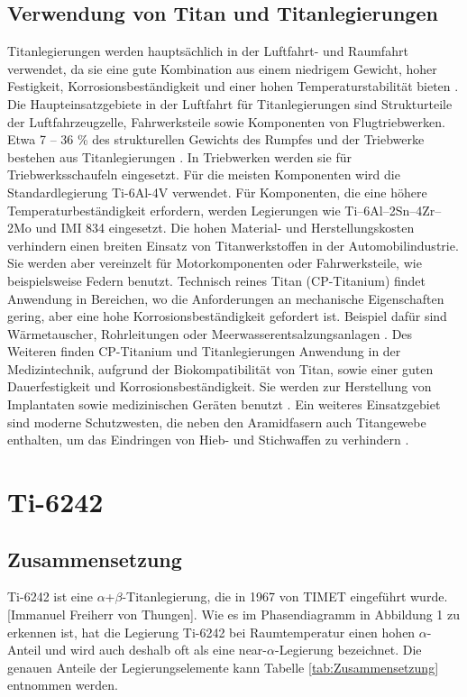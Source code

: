 \pagebreak

\subsection{Verwendung von Titan und Titanlegierungen}
Titanlegierungen werden hauptsächlich in der Luftfahrt- und Raumfahrt verwendet, da sie eine gute Kombination aus einem niedrigem Gewicht, hoher Festigkeit, Korrosionsbeständigkeit und einer hohen Temperaturstabilität bieten \cite{C.Leyens.2005,R.R.Boyer.1996,M.PetersJ.KumpfertC.WardC.Leyens.2003}. Die Haupteinsatzgebiete in der Luftfahrt für Titanlegierungen sind Strukturteile der Luftfahrzeugzelle, Fahrwerksteile sowie Komponenten von Flugtriebwerken. Etwa 7 -- 36 \% des strukturellen Gewichts des Rumpfes und der Triebwerke bestehen aus Titanlegierungen \cite{Lutjering.2007}. In Triebwerken werden sie für Triebwerksschaufeln eingesetzt. Für die meisten Komponenten wird die Standardlegierung Ti-6Al-4V verwendet. Für Komponenten, die eine höhere Temperaturbeständigkeit erfordern, werden Legierungen wie Ti–6Al–2Sn–4Zr–2Mo und IMI 834 eingesetzt. Die hohen Material- und Herstellungskosten verhindern einen breiten Einsatz von Titanwerkstoffen in der Automobilindustrie. Sie werden aber vereinzelt für Motorkomponenten oder Fahrwerksteile, wie beispielsweise Federn benutzt. Technisch reines Titan (CP-Titanium) findet Anwendung in Bereichen, wo die Anforderungen an mechanische Eigenschaften gering, aber eine hohe Korrosionsbeständigkeit gefordert ist. Beispiel dafür sind Wärmetauscher, Rohrleitungen oder Meerwasserentsalzungsanlagen \cite{A.D.KhawajiaI.K.KutubkhanahaJ.M.Wieb.2008}. Des Weiteren finden CP-Titanium und Titanlegierungen Anwendung in der Medizintechnik, aufgrund der Biokompatibilität von Titan, sowie einer guten Dauerfestigkeit und Korrosionsbeständigkeit. Sie werden zur Herstellung von Implantaten sowie medizinischen Geräten benutzt \cite{M.GeethaA.K.SinghR.AsokamaniA.K.Gogia.2009}. Ein weiteres Einsatzgebiet sind moderne Schutzwesten, die neben den Aramidfasern auch Titangewebe enthalten, um das Eindringen von Hieb- und Stichwaffen zu verhindern \cite{C.Leyens.2005}.  



\section{Ti-6242}

\subsection{Zusammensetzung}
Ti-6242 ist eine $\alpha$+$\beta$-Titanlegierung, die  in 1967 von TIMET eingeführt wurde. [Immanuel Freiherr von Thungen]. 
Wie es im Phasendiagramm in Abbildung 1 zu erkennen ist, hat die Legierung Ti-6242 bei Raumtemperatur einen hohen $\alpha$-Anteil und wird auch deshalb oft als eine near-$\alpha$-Legierung bezeichnet.
Die genauen Anteile der Legierungselemente kann Tabelle \ref{tab:Zusammensetzung} entnommen werden. 


